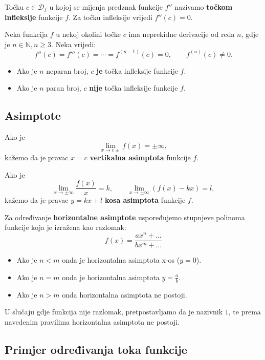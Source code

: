 Točku $c\in\mathcal{D}_f$ u kojoj se mijenja predznak funkcije $f''$ nazivamo
\textbf{točkom infleksije} funkcije $f$. Za točku infleksije vrijedi $f''(c) = 0$.

\begin{theorem}
    Neka funkcija $f$ u nekoj okolini točke $c$ ima neprekidne derivacije od
    reda $n$, gdje je $n\in\mathbb{N}, n\geq 3$.
    Neka vrijedi:
    $$
    f''(c)=f'''(c)=\cdots=f^{(n-1)}(c)=0,\qquad f^{(n)}(c) \neq 0.
    $$

    \begin{itemize}
        \item Ako je $n$ neparan broj, $c$ \textbf{je} točka infleksije funkcije $f$.
        \item Ako je $n$ paran broj, $c$ \textbf{nije} točka infleksije funkcije $f$.
    \end{itemize}
\end{theorem}

\subsection{Asimptote}

Ako je
$$
\lim_{x\to c\pm}f(x)=\pm\infty,
$$
kažemo da je pravac $x=c$ \textbf{vertikalna asimptota} funkcije $f$.

Ako je
$$
\lim_{x\to\pm\infty}\frac{f(x)}{x}=k,\qquad \lim_{x\to\pm\infty}(f(x)-kx)=l,
$$
kažemo da je pravac $y=kx+l$ \textbf{kosa asimptota} funkcije $f$.

Za određivanje \textbf{horizontalne asimptote} uspoređujemo stupnjeve polinoma
funkcije koja je izražena kao razlomak:
$$
f(x)=\frac{ax^n+\dots}{bx^m+\dots}
$$
\begin{itemize}
    \item Ako je $n<m$ onda je horizontalna asimptota x-os ($y=0$).
    \item Ako je $n=m$ onda je horizontalna asimptota $\displaystyle y=\frac{a}{b}$.
    \item Ako je $n>m$ onda horizontalna asimptota ne postoji.
\end{itemize}

U slučaju gdje funkcija nije razlomak, pretpostavljamo da je nazivnik $1$, te
prema navedenim pravilima horizontalna asimptota ne postoji.

\subsection{Primjer određivanja toka funkcije}


